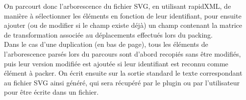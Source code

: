On parcourt donc l'arborescence du fichier SVG, en utilisant rapidXML, de manière à sélectionner les éléments en fonction de leur identifiant, pour ensuite ajouter (ou de modifier si le champ existe déjà) un champ contenant la matrice de transformation associée au déplacements effectués lors du packing.\\

Dans le cas d'une duplication (en bas de page), tous les éléments de l'arborescence parsés lors du parcours sont d'abord recopiés sans être modifiés, puis leur version modifiée est ajoutée si leur identifiant est reconnu comme élément à packer. On écrit ensuite sur la sortie standard le texte correspondant au fichier SVG ainsi généré, qui sera récupéré par le plugin ou par l'utilisateur pour être écrite dans un fichier.

